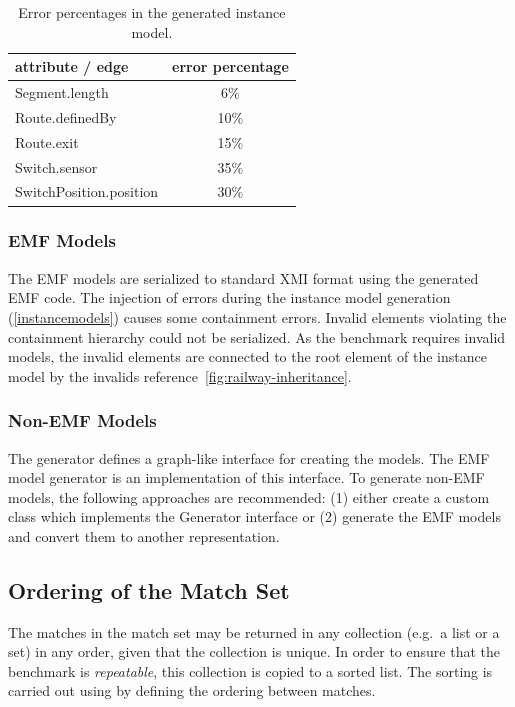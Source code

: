 \documentclass[submission,copyright,creativecommons]{eptcs}
\newcommand{\figref}[1]{\autoref{fig:#1}}
\begin{document}
\begin{table}
	\centering
	\begin{tabular}{ | l | c | }
		\hline
		\bf attribute / edge & \bf error percentage \\\hline
		\sf Segment.length          & 6\%  \\\hline
		\sf Route.definedBy         & 10\% \\\hline
		\sf Route.exit              & 15\% \\\hline
		\sf Switch.sensor           & 35\% \\\hline
		\sf SwitchPosition.position & 30\% \\\hline
	\end{tabular}
	\caption{Error percentages in the generated instance model.}
	\label{tab:errorpercentages}
\end{table}

\subsubsection{EMF Models}
\label{emf-models}

The EMF models are serialized to standard XMI format using the generated EMF code. The injection of errors during the instance model generation (\autoref{instancemodels}) causes some containment errors. Invalid elements violating the containment hierarchy could not be serialized. As the benchmark requires invalid models, the invalid elements are connected to the root element of the instance model by the \textsf{invalids} reference~\figref{railway-inheritance}.

\subsubsection{Non-EMF Models}

The generator defines a graph-like interface for creating the models. The EMF model generator is an implementation of this interface. To generate non-EMF models, the following approaches are recommended: (1) either create a custom class which implements the \textsf{Generator} interface or (2) generate the EMF models and convert them to another representation.

\subsection{Ordering of the Match Set}
\label{ordering}

The matches in the match set may be returned in any collection (e.g.\ a list or a set) in any order, given that the collection is unique. In order to ensure that the benchmark is \emph{repeatable}, this collection is copied to a sorted list. The sorting is carried out using by defining the ordering between matches.
\end{document}
